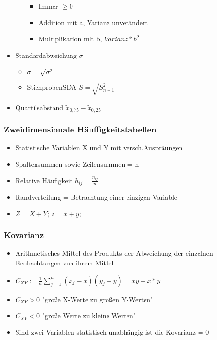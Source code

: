 \documentclass[a4paper]{article}
\begin{document}
\begin{landscape}
\begin{multicols}{4}
\begin{itemize}[noitemsep,nolistsep,leftmargin=*]
\begin{itemize}[noitemsep,nolistsep,leftmargin=*]
\begin{itemize}[noitemsep,nolistsep,leftmargin=*]
                    \item Immer $ \geq 0$
                    \item Addition mit a, Varianz unverändert
                    \item Multiplikation mit b, $Varianz * b^2$
                \end{itemize}
        \end{itemize}
        \item Standardabweichung $\sigma$
        \begin{itemize}[noitemsep,nolistsep,leftmargin=*]
            \item $\sigma = \sqrt{\sigma^2}$
            \item StichprobenSDA $S = \sqrt{S^2_{n-1}}$
        \end{itemize}
        \item Quartilsabstand $\widetilde{x}_{0,75} - \widetilde{x}_{0,25}$
    \end{itemize}

    \subsubsection*{Zweidimensionale Häuffigkeitstabellen}
    \begin{itemize}[noitemsep,nolistsep,leftmargin=*]
        \item Statistische Variablen X und Y mit versch.Auspräungen
        \item Spaltensummen sowie Zeilensummen = n
        \item Relative Häufigkeit $h_{ij} = \frac{n_{ij}}{n}$
        \item Randverteilung = Betrachtung einer einzigen Variable
        \item $ Z = X +Y$; $\overline{z} = \overline{x} + \overline{y}$; 
    \end{itemize}

    \subsubsection*{Kovarianz}
    \begin{itemize}[noitemsep,nolistsep,leftmargin=*]
        \item Arithmetisches Mittel des Produkts der Abweichung der einzelnen Beobachtungen von ihrem Mittel
        \item $C_{XY} := \frac{1}{n}\sum_{j = 1}^{n}{(x_j - \overline{x})(y_j - \overline{y})} = \overline{xy} - \overline{x}*\overline{y}$ 
        \item  $C_{XY} > 0$ "große X-Werte zu großen Y-Werten"
        \item $C_{XY} < 0$ "große Werte zu kleine Werten"
        \item Sind zwei Variablen statistisch unabhängig ist die Kovarianz = 0
    \end{itemize}


\end{multicols}
\end{landscape}
\end{document}
